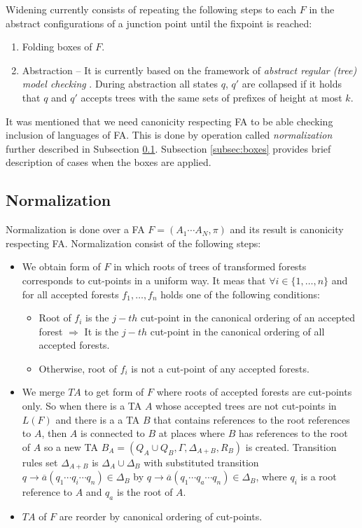 Widening currently consists of repeating the following steps to each $F$ in the abstract configurations of a junction point until the fixpoint is reached:
\begin{enumerate}
		\item Folding boxes of $F$.
		\item Abstraction -- It is currently based on the framework of \emph{abstract regular (tree) model checking} \cite{artmc}.
			During abstraction all states $q$, $q'$ are collapsed if it holds that
			$q$ and $q'$ accepts trees with the same sets of prefixes of height at most $k$.
\end{enumerate}

It was mentioned that we need canonicity respecting FA to be able checking inclusion of languages of FA.
This is done by operation called \emph{normalization} further described in Subsection \ref{subsec:norm}.
Subsection \ref{subsec:boxes} provides brief description of cases when the boxes are applied.

\subsection{Normalization}
\label{subsec:norm}

Normalization is done over a FA $F = (A_1 \cdots A_N,\pi)$ and its result is canonicity respecting FA.
Normalization consist of the following steps:
\begin{itemize}
		\item We obtain form of $F$ in which roots of trees of transformed forests corresponds to
			cut-points in a uniform way.
			It meas that $\forall i \in \{1,\ldots,n\}$ and for all accepted forests $f_1,\ldots,f_n$ holds
			one of the following conditions:
			\begin{itemize}
				\item Root of $f_i$ is the $j-th$ cut-point in the canonical ordering of an accepted forest $\Rightarrow$
					It is the $j-th$ cut-point in the canonical ordering of all accepted forests.
				\item Otherwise, root of $f_i$ is not a cut-point of any accepted forests.
			\end{itemize}
		\item We merge $TA$ to get form of $F$ where roots of accepted forests are cut-points only.
			So when there is a TA $A$ whose accepted trees are not cut-points in $L(F)$ and there is
			a a TA $B$ that contains references to the root references to $A$, then $A$ is connected
			to $B$ at places where $B$ has references to the root of $A$ so a new
			TA $B_A = (Q_A \cup Q_B, \Gamma, \Delta_{A+B}, R_B)$ is created.
			Transition rules set $\Delta_{A+B}$ is $\Delta_A \cup \Delta_B$ with substituted transition $q \rightarrow  \overline{a} (q_1 \cdots q_i \cdots q_n) \in \Delta_B$
			by $q \rightarrow  \overline{a} (q_1 \cdots q_a \cdots q_n) \in \Delta_B$, where $q_i$ is a root reference to $A$ and $q_a$ is the root of $A$. 
		\item $TA$ of $F$ are reorder by canonical ordering of cut-points.
\end{itemize}

